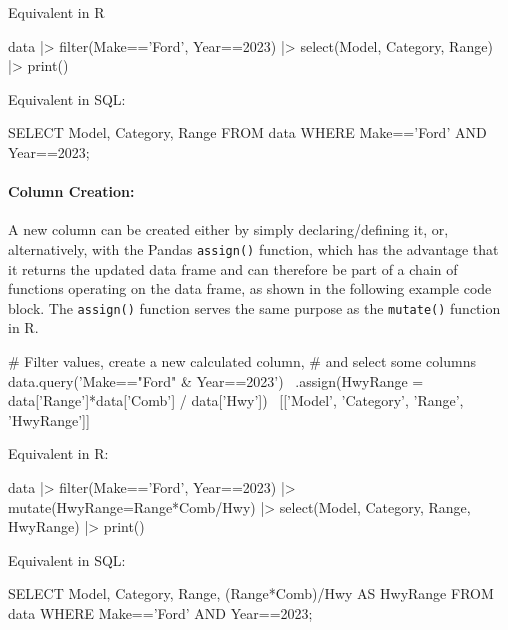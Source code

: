 \begin{multicols}{2}
Equivalent in R
\begin{Rcode}
data |> 
  filter(Make=='Ford', 
         Year==2023) |> 
  select(Model, Category, 
            Range) |>
  print()
\end{Rcode}

Equivalent in SQL:

\begin{sqlcode}
SELECT Model, Category, Range 
   FROM data 
   WHERE Make=='Ford' AND 
         Year==2023;
\end{sqlcode}
\end{multicols}

\paragraph*{Column Creation:} A new column can be created either by simply declaring/defining it, or, alternatively, with the Pandas \texttt{assign()} function, which has the advantage that it returns the updated data frame and can therefore be part of a chain of functions operating on the data frame, as shown in the following example code block. The \texttt{assign()} function serves the same purpose as the \texttt{mutate()} function in R.

\begin{samepage}
\begin{pythoncode}
# Filter values, create a new calculated column,
# and select some columns
data.query('Make=="Ford" & Year==2023') \
    .assign(HwyRange = data['Range']*data['Comb'] / data['Hwy']) \
    [['Model', 'Category', 'Range', 'HwyRange']]
\end{pythoncode}
\end{samepage}

\begin{multicols}{2}
Equivalent in R:
\begin{Rcode}
data |> 
  filter(Make=='Ford', 
         Year==2023) |> 
  mutate(HwyRange=Range*Comb/Hwy) |>
  select(Model, Category, 
         Range, HwyRange) |>
  print()
\end{Rcode}

Equivalent in SQL:

\begin{sqlcode}
SELECT Model, Category, Range, 
     (Range*Comb)/Hwy AS HwyRange 
   FROM data 
   WHERE Make=='Ford' AND 
         Year==2023;
\end{sqlcode}
\end{multicols}

